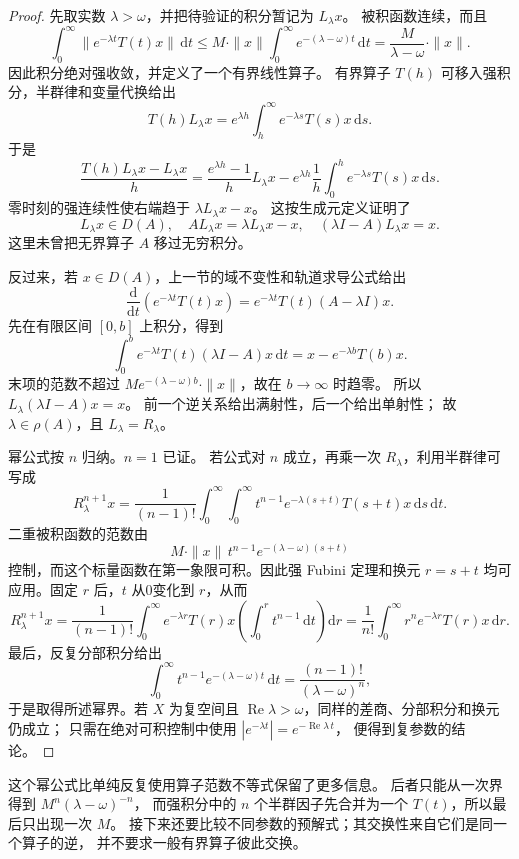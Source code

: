 \begin{proof}
先取实数 \(\lambda>\omega\)，并把待验证的积分暂记为 \(L_\lambda x\)。
被积函数连续，而且
\[
 \int_0^\infty
 \|e^{-\lambda t}T(t)x\|\,\mathrm dt
 \le M\cdot\|x\|\int_0^\infty e^{-(\lambda-\omega)t}\,\mathrm dt
 =\frac{M}{\lambda-\omega}\cdot\|x\|.
\]
因此积分绝对强收敛，并定义了一个有界线性算子。
有界算子 \(T(h)\) 可移入强积分，半群律和变量代换给出
\[
 T(h)L_\lambda x
 =e^{\lambda h}\int_h^\infty e^{-\lambda s}T(s)x\,\mathrm ds.
\]
于是
\[
 \frac{T(h)L_\lambda x-L_\lambda x}{h}
 =\frac{e^{\lambda h}-1}{h}L_\lambda x
 -e^{\lambda h}\frac1h\int_0^h e^{-\lambda s}T(s)x\,\mathrm ds.
\]
零时刻的强连续性使右端趋于 \(\lambda L_\lambda x-x\)。
这按生成元定义证明了
\[
 L_\lambda x\in D(A),
 \quad
 AL_\lambda x=\lambda L_\lambda x-x,
 \quad
 (\lambda I-A)L_\lambda x=x.
\]
这里未曾把无界算子 \(A\) 移过无穷积分。

反过来，若 \(x\in D(A)\)，上一节的域不变性和轨道求导公式给出
\[
 \frac{\mathrm d}{\mathrm dt}
       \left(e^{-\lambda t}T(t)x\right)
 =e^{-\lambda t}T(t)(A-\lambda I)x.
\]
先在有限区间 \([0,b]\) 上积分，得到
\[
 \int_0^b e^{-\lambda t}T(t)(\lambda I-A)x\,\mathrm dt
 =x-e^{-\lambda b}T(b)x.
\]
末项的范数不超过
\(Me^{-(\lambda-\omega)b}\cdot\|x\|\)，故在 \(b\to\infty\) 时趋零。
所以 \(L_\lambda(\lambda I-A)x=x\)。
前一个逆关系给出满射性，后一个给出单射性；
故 \(\lambda\in\rho(A)\)，且 \(L_\lambda=R_\lambda\)。

幂公式按 \(n\) 归纳。\(n=1\) 已证。
若公式对 \(n\) 成立，再乘一次 \(R_\lambda\)，利用半群律可写成
\[
 R_\lambda^{n+1}x
 =\frac1{(n-1)!}\int_0^\infty\int_0^\infty
    t^{n-1}e^{-\lambda(s+t)}T(s+t)x\,\mathrm ds\,\mathrm dt.
\]
二重被积函数的范数由
\[
 M\cdot\|x\|\,
 t^{n-1}e^{-(\lambda-\omega)(s+t)}
\]
控制，而这个标量函数在第一象限可积。因此强 Fubini 定理和换元
\(r=s+t\) 均可应用。固定 \(r\) 后，\(t\) 从0变化到 \(r\)，从而
\[
 R_\lambda^{n+1}x
 =\frac1{(n-1)!}\int_0^\infty
   e^{-\lambda r}T(r)x
   \left(\int_0^r t^{n-1}\,\mathrm dt\right)\mathrm dr
 =\frac1{n!}\int_0^\infty r^ne^{-\lambda r}T(r)x\,\mathrm dr.
\]
最后，反复分部积分给出
\[
 \int_0^\infty t^{n-1}e^{-(\lambda-\omega)t}\,\mathrm dt
 =\frac{(n-1)!}{(\lambda-\omega)^n},
\]
于是取得所述幂界。若 \(X\) 为复空间且
\(\operatorname{Re}\lambda>\omega\)，同样的差商、分部积分和换元仍成立；
只需在绝对可积控制中使用
\(|e^{-\lambda t}|=e^{-\operatorname{Re}\lambda\,t}\)，
便得到复参数的结论。
\end{proof}

这个幂公式比单纯反复使用算子范数不等式保留了更多信息。
后者只能从一次界得到 \(M^n(\lambda-\omega)^{-n}\)，
而强积分中的 \(n\) 个半群因子先合并为一个 \(T(t)\)，所以最后只出现一次 \(M\)。
接下来还要比较不同参数的预解式；其交换性来自它们是同一个算子的逆，
并不要求一般有界算子彼此交换。

